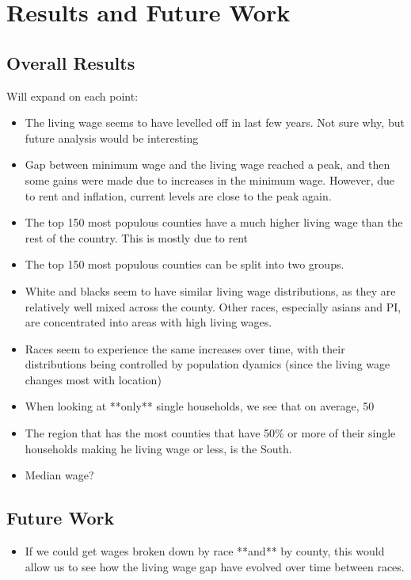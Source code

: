 \chapter{Results and Future Work}\label{ch:results}

\section{Overall Results}

Will expand on each point:

\begin{itemize}
\item The living wage seems to have levelled off in last few years. Not sure why, but future analysis would be interesting
\item Gap between minimum wage and the living wage reached a peak, and then some gains were made due to increases in the minimum wage. However, due to rent and inflation, current levels are close to the peak again.
\item The top 150 most populous counties have a much higher living wage than the rest of the country. This is mostly due to rent
\item The top 150 most populous counties can be split into two groups. 
\item White and blacks seem to have similar living wage distributions, as they are relatively well mixed across the county. Other races, especially asians and PI, are concentrated into areas with high living wages.
\item Races seem to experience the same increases over time, with their distributions being controlled by population dyamics (since the living wage changes most with location)
\item When looking at **only** single households, we see that on average, 50%
\item The region that has the most counties that have 50\% or more of their single households making he living wage or less, is the South.

\item Median wage?
\end{itemize}



\section{Future Work}

\begin{itemize}
\item If we could get wages broken down by race **and** by county, this would allow us to see how the living wage gap have evolved over time between races. 
\end{itemize}